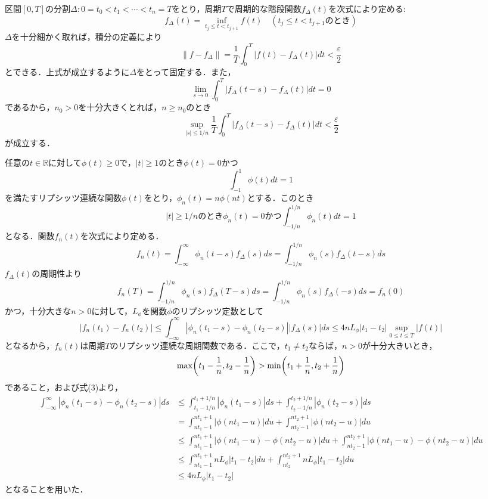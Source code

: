 \documentclass[dvipdfmx,a4j,10pt]{jsarticle}
\makeatletter
\theoremstyle{mystyle1}
\theoremstyle{mystyle3}
\theoremstyle{mystyle4}
\theoremstyle{mystyle6}
\theoremstyle{mystyle2}
\theoremstyle{mystyle5}
\renewenvironment{proof}[1][\proofname]{\par
  \pushQED{\qed}%
  \normalfont
  \topsep6\p@\@plus6\p@ \trivlist
  \item[\hskip\labelsep{\bfseries\sffamily #1}]\ignorespaces
}{%
  \popQED\endtrivlist\@endpefalse
}
\renewcommand\proofname{証明}
\makeatother
\begin{document}

\begin{proof}
	区間$[0,T]$の分割$\Delta:0=t_0<t_1<\cdots<t_n=T$をとり，周期$T$で周期的な階段関数$f_\Delta (t)$を次式により定める:
	\[
		f_\Delta (t)=\inf_{t_j\leq t<t_{j+1}} f(t)\quad(t_j\leq t<t_{j+1}のとき)
	\]
	$\Delta$を十分細かく取れば，積分の定義により
	\begin{equation}
		\|f-f_\Delta\|=\frac{1}{T}\int_0^T|f(t)-f_\Delta(t)|dt<\frac{\varepsilon}{2} \tag{1}
	\end{equation}
	とできる．上式が成立するように$\Delta$をとって固定する．また，
	\[
		\lim_{s\to 0}\int_0^T|f_\Delta(t-s)-f_\Delta(t)|dt=0
	\]
	であるから，$n_0>0$を十分大きくとれば，$n\geq n_0$のとき
	\begin{equation}
		\sup_{|s|\leq 1/n}\frac{1}{T}\int_0^T|f_\Delta(t-s)-f_\Delta(t)|dt<\frac{\varepsilon}{2} \tag{2}
	\end{equation}
	が成立する．

	任意の$t\in\mathbb{R}$に対して$\phi(t)\geq 0$で，$|t|\geq 1$のとき$\phi(t)=0$かつ
	\[
		\int_{-1}^1 \phi(t)dt=1
	\]
	を満たすリプシッツ連続な関数$\phi(t)$をとり，$\phi_n(t)=n\phi(nt)$とする．このとき
	\begin{equation}
		|t|\geq 1/nのとき\phi_n(t)=0かつ\int_{-1/n}^{1/n}\phi_n(t)dt=1 \tag{3}
	\end{equation}
	となる．関数$f_n(t)$を次式により定める．
	\[
		f_n(t)=\int_{-\infty}^\infty \phi_n(t-s)f_\Delta(s)ds=\int_{-1/n}^{1/n}\phi_n(s)f_\Delta(t-s)ds
	\]
	$f_\Delta (t)$の周期性より
	\[
		f_n(T)=\int_{-1/n}^{1/n}\phi_n(s)f_\Delta(T-s)ds=\int_{-1/n}^{1/n}\phi_n(s)f_\Delta(-s)ds=f_n(0)
	\]
	かつ，十分大きな$n>0$に対して，$L_\phi$を関数$\phi$のリプシッツ定数として
	\[
		|f_n(t_1)-f_n(t_2)|\leq\int_{-\infty}^\infty|\phi_n(t_1-s)-\phi_n(t_2-s)||f_\Delta(s)|ds\leq 4nL_\phi|t_1-t_2|\sup_{0\leq t\leq T}|f(t)|
	\]
	となるから，$f_n(t)$は周期$T$のリプシッツ連続な周期関数である．ここで，$t_1\neq t_2$ならば，$n>0$が十分大きいとき，
	\[
		\max\mleft(t_1-\frac{1}{n},t_2-\frac{1}{n}\mright)>\min\mleft(t_1+\frac{1}{n},t_2+\frac{1}{n}\mright)
	\]
	であること，および式(3)より，
	\[
		\begin{split}
			\int_{-\infty}^\infty|\phi_n(t_1-s)-\phi_n(t_2-s)|ds
			&\leq \int_{t_1-1/n}^{t_1+1/n}|\phi_n(t_1-s)|ds+\int_{t_2-1/n}^{t_2+1/n}|\phi_n(t_2-s)|ds \\
			& =\int_{nt_1-1}^{nt_1+1}|\phi(nt_1-u)|du+\int_{nt_2-1}^{nt_2+1}|\phi(nt_2-u)|du \\
			&\leq \int_{nt_1-1}^{nt_1+1}|\phi(nt_1-u)-\phi(nt_2-u)|du+\int_{nt_2-1}^{nt_2+1}|\phi(nt_1-u)-\phi(nt_2-u)|du \\
			&\leq \int_{nt_1-1}^{nt_1+1} nL_\phi|t_1-t_2|du +\int_{nt_2}^{nt_2+1}nL_\phi|t_1-t_2|du \\
			&\leq 4nL_\phi|t_1-t_2|
		\end{split}
	\]
	となることを用いた．


\end{proof}
\end{document}
